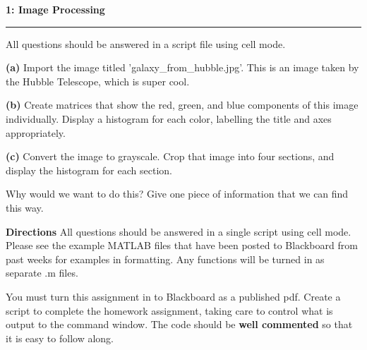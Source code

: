 \documentclass[11pt]{article}
\newcommand\question[2]{\vspace{.25in}\textbf{#1: #2}\vspace{.5em}\hrule\vspace{.10in}}
\renewcommand\part[1]{\vspace{.10in}\textbf{(#1)}}
\begin{document}
\raggedright

\question{1}{Image Processing} 
All questions should be answered in a script file using cell mode.

\part{a} Import the image titled 'galaxy\_from\_hubble.jpg'. 
This is an image taken by the Hubble Telescope, which is super cool.

\part{b} Create matrices that show the red, green, and blue components of this image individually. 
Display a histogram for each color, labelling the title and axes appropriately. 

\part{c} Convert the image to grayscale.
Crop that image into four sections, and display the histogram for each section. 

Why would we want to do this? Give one piece of information that we can find this way.

\vspace{1.0em}
\textbf{Directions}
All questions should be answered in a single script using cell mode. Please see the example MATLAB files that have been posted to Blackboard from past weeks for examples in formatting. Any functions will be turned in as separate .m files.

You must turn this assignment in to Blackboard as a published pdf. Create a script to complete the homework assignment, taking care to control what is output to the command window. The code should be \textbf{well commented} so that it is easy to follow along. 
\end{document}
